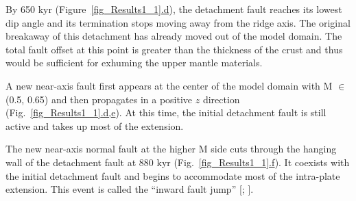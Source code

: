 By 650 kyr (Figure~\hyperref[fig_Results1_1]{\ref{fig_Results1_1}.d}), the detachment fault reaches its lowest dip angle and its termination stops moving away from the ridge axis. The original breakaway of this detachment has already moved out of the model domain.
The total fault offset at this point is greater than the thickness of the crust and thus would be sufficient for exhuming the upper mantle materials. %

A new near-axis fault first appears at the center of the model domain with M $\in$ (0.5, 0.65) and then propagates in a positive $z$ direction (Fig.~\hyperref[fig_Results1_1]{\ref{fig_Results1_1}.d,e}). At this time, the initial detachment fault is still active and takes up most of the extension. %

The new near-axis normal fault at the higher M side cuts through the hanging wall of the detachment fault at 880 kyr (Fig.~\hyperref[fig_Results1_1]{\ref{fig_Results1_1}.f}). It coexists with the initial detachment fault and begins to accommodate most of the intra-plate extension. This event is called the ``inward fault jump'' [\citealp{Tucholke1998}; \citealp{Dick2008}].  %

